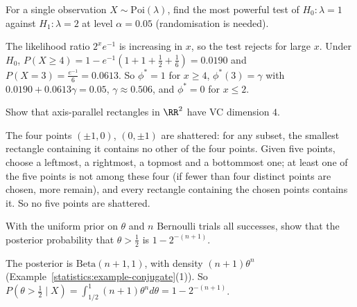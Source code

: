 \begin{exercise}\label{statistics:exercise-neyman-pearson-poisson}
For a single observation $X \sim \mathrm{Poi}(\lambda)$, find the most powerful test of $H_0 : \lambda = 1$ against $H_1 : \lambda = 2$ at level $\alpha = 0.05$ (randomisation is needed).
\end{exercise}

\begin{solution}
The likelihood ratio $2^xe^{-1}$ is increasing in $x$, so the test rejects for large $x$. Under $H_0$, $P(X \geq 4) = 1 - e^{-1}(1 + 1 + \frac12 + \frac16) = 0.0190$ and $P(X = 3) = \frac{e^{-1}}{6} = 0.0613$. So $\phi^* = 1$ for $x \geq 4$, $\phi^*(3) = \gamma$
with $0.0190 + 0.0613\gamma = 0.05$, $\gamma \approx 0.506$, and $\phi^* = 0$ for $x \leq 2$.
\end{solution}

\begin{exercise}\label{statistics:exercise-vc-rectangles}
Show that axis-parallel rectangles in $\RR^2$ have VC dimension $4$.
\end{exercise}

\begin{solution}
The four points $(\pm1, 0)$, $(0, \pm1)$ are shattered: for any subset, the smallest rectangle containing it contains no other of the four points. Given five points, choose a leftmost, a rightmost, a topmost and a bottommost one;
at least one of the five points is not among these four (if fewer than four distinct points are chosen, more remain), and every rectangle containing the chosen points contains it. So no five points are shattered.
\end{solution}

\begin{exercise}\label{statistics:exercise-posterior-predictive}
With the uniform prior on $\theta$ and $n$ Bernoulli trials all successes, show that the posterior probability that $\theta > \frac12$ is $1 - 2^{-(n+1)}$.
\end{exercise}

\begin{solution}
The posterior is $\mathrm{Beta}(n + 1, 1)$, with density $(n + 1)\theta^n$ (Example~\ref{statistics:example-conjugate}(1)). So $P(\theta > \frac12 \mid X) = \int_{1/2}^1(n + 1)\theta^nd\theta = 1 - 2^{-(n+1)}$.
\end{solution}
